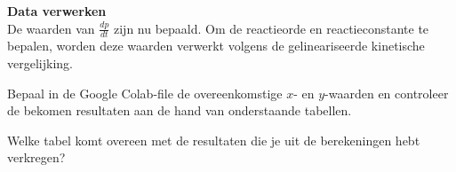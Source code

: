 \documentclass{ximera}
\begin{document}
\begin{question} \textbf{Data verwerken}\\

De waarden van $\frac{dp}{dt}$ zijn nu bepaald. Om de reactieorde en
reactieconstante te bepalen, worden deze waarden verwerkt volgens de
gelineariseerde kinetische vergelijking.

Bepaal in de Google Colab-file de overeenkomstige $x$- en $y$-waarden en controleer de bekomen resultaten aan de hand van onderstaande tabellen.

Welke tabel komt overeen met de resultaten die je uit de berekeningen hebt verkregen?

\begin{multipleChoice}

    
\end{multipleChoice}


\end{question}
\end{document}
